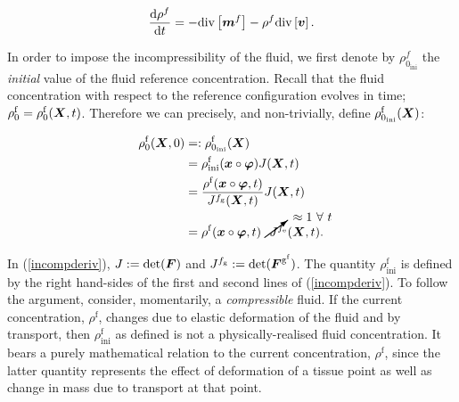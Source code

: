 \begin{equation}
\frac{\mathrm{d}\rho^f}{\mathrm{d}t} = - \mathrm{div}\left[\mbox{\boldmath$ m$}^f\right]
- \rho^f \mathrm{div}\left[\mbox{\boldmath$ v$}\right].
\label{fluidtransporteqn}
\end{equation}

\noindent In order to impose the incompressibility of the fluid, we
first denote by $\rho_{0_{\mathrm{ini}}}^{f}$ the {\sl initial} value
of the fluid reference concentration. Recall that the fluid
concentration with respect to the reference configuration evolves in
time; $\rho^\mathrm{f}_0 = \rho^\mathrm{f}_0(\mbox{\boldmath$ X$},t)$. Therefore we can
precisely, and non-trivially, define $\rho_{0_{\mathrm{ini}}} ^
{\mathrm{f}}(\mbox{\boldmath$ X$})$:

\begin{equation}
\begin{split}
\rho_{0}^{\mathrm{f}}(\bX,0)
                   &=:\rho_{0_{\mathrm{ini}}}^{\mathrm{f}}(\bX)\\ 
                   &=\rho_{\mathrm{ini}}^{\mathrm{f}}(\bx\circ\Bvarphi)
                   J(\bX, t)\\ &=\frac{\rho^{\mathrm{f}}
                   (\bx\circ\Bvarphi,t)} {J^{f_\mathrm{g}}(\bX,t)}
                   J(\bX,t)\\ &=\rho^{\mathrm{f}} (\bx\circ\Bvarphi,t)
                   \cancelto{\approx 1\ \forall\ t}
                   {J^{f_\mathrm{e}}}(\bX,t).\\
\label{incompderiv}
\end{split}
\end{equation}

In (\ref{incompderiv}), $J := \mathrm{det}(\mbox{\boldmath$ F$})$ and $J^{f_\mathrm{g}} :=
\mathrm{det}(\mbox{\boldmath$ F$}^{\mathrm{g}^{\mathrm{f}}})$. The quantity
$\rho_{\mathrm{ini}}^{\mathrm{f}}$ is defined by the right hand-sides
of the first and second lines of (\ref{incompderiv}). To follow the
argument, consider, momentarily, a \emph{compressible} fluid. If the
current concentration, $\rho^\mathrm{f}$, changes due to elastic
deformation of the fluid and by transport, then
$\rho_{\mathrm{ini}}^{\mathrm{f}}$ as defined is not a
physically-realised fluid concentration. It bears a purely
mathematical relation to the current concentration, $\rho^\mathrm{f}$,
since the latter quantity represents the effect of deformation of a
tissue point as well as change in mass due to transport at that
point.

